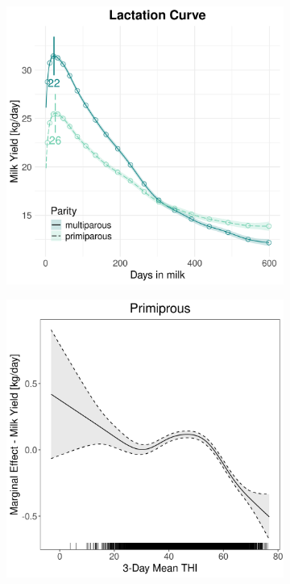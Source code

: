 \begin{figure}[H]
\begin{subfigure}[b]{0.45\textwidth}
        \includegraphics[width=\textwidth]{thesis/figures/models/milk/after2010/bs_milk_after2010/bs_milk_after2010_marginal_dim_milk_combined.png}
    \end{subfigure}
    \begin{subfigure}[b]{0.45\textwidth}
        \centering
        \includegraphics[width=\textwidth]{thesis/figures/models/milk/after2010/bs_milk_after2010/bs_milk_after2010_marginal_thi_milk_primi.png}

\end{subfigure}
\end{figure}
